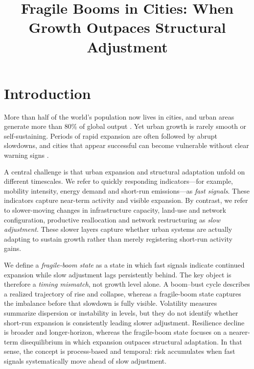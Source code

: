 \documentclass[oneside,pdflatex,sn-nature]{sn-jnl}
\title[Fragile booms in cities]{Fragile Booms in Cities: When Growth Outpaces Structural Adjustment}
\author[1]{\fnm{Sirun} \sur{Li}}
\author[1]{\fnm{Haoxin} \sur{Lv}}
\author*[1]{\fnm{Fan} \sur{Zhang}}\email{fanzhanggis@pku.edu.cn}
\affil[1]{\orgname{Peking University}, \orgaddress{\city{Beijing}, \country{China}}}
\begin{document}
\maketitle

\section{Introduction}

More than half of the world's population now lives in cities, and urban areas generate more than 80\% of global output \cite{glaeser2011triumph,duranton2015growing,moretti2012real,ciccone1996productivity,duranton2004microfoundations}. Yet urban growth is rarely smooth or self-sustaining. Periods of rapid expansion are often followed by abrupt slowdowns, and cities that appear successful can become vulnerable without clear warning signs \cite{hausmann2005growth,eichengreen2012slowdown,hidalgo2007product,martin2012regional,dellagostino2017world}.

A central challenge is that urban expansion and structural adaptation unfold on different timescales. We refer to quickly responding indicators---for example, mobility intensity, energy demand and short-run emissions---as \emph{fast signals}. These indicators capture near-term activity and visible expansion. By contrast, we refer to slower-moving changes in infrastructure capacity, land-use and network configuration, productive reallocation and network restructuring as \emph{slow adjustment}.\cite{batty2013newscience,bettencourt2007growth,rozenfeld2011laws,west2017scale} These slower layers capture whether urban systems are actually adapting to sustain growth rather than merely registering short-run activity gains.

We define a \emph{fragile-boom state} as a state in which fast signals indicate continued expansion while slow adjustment lags persistently behind. The key object is therefore a \emph{timing mismatch}, not growth level alone. A boom--bust cycle describes a realized trajectory of rise and collapse, whereas a fragile-boom state captures the imbalance before that slowdown is fully visible. Volatility measures summarize dispersion or instability in levels, but they do not identify whether short-run expansion is consistently leading slower adjustment. Resilience decline is broader and longer-horizon, whereas the fragile-boom state focuses on a nearer-term disequilibrium in which expansion outpaces structural adaptation. In that sense, the concept is process-based and temporal: risk accumulates when fast signals systematically move ahead of slow adjustment.
\end{document}
